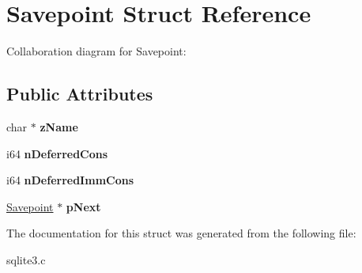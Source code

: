 \hypertarget{structSavepoint}{}\section{Savepoint Struct Reference}
\label{structSavepoint}


Collaboration diagram for Savepoint\+:
\subsection*{Public Attributes}
\begin{DoxyCompactItemize}
\item 
char $\ast$ {\bfseries z\+Name}\hypertarget{structSavepoint_a0ba08ea77fcfd93099288375e2e9b1ec}{}\label{structSavepoint_a0ba08ea77fcfd93099288375e2e9b1ec}

\item 
i64 {\bfseries n\+Deferred\+Cons}\hypertarget{structSavepoint_ae00dd8f725701d9e31da2edbb0b27435}{}\label{structSavepoint_ae00dd8f725701d9e31da2edbb0b27435}

\item 
i64 {\bfseries n\+Deferred\+Imm\+Cons}\hypertarget{structSavepoint_a91b8cb5fac1bdf7d8f76ec30c82b862d}{}\label{structSavepoint_a91b8cb5fac1bdf7d8f76ec30c82b862d}

\item 
\hyperlink{structSavepoint}{Savepoint} $\ast$ {\bfseries p\+Next}\hypertarget{structSavepoint_a8d785c3c0eeb6f0c62ea5391892c78cb}{}\label{structSavepoint_a8d785c3c0eeb6f0c62ea5391892c78cb}

\end{DoxyCompactItemize}


The documentation for this struct was generated from the following file\+:\begin{DoxyCompactItemize}
\item 
sqlite3.\+c\end{DoxyCompactItemize}
